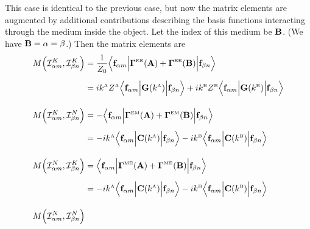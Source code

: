 \documentclass[letterpaper]{article}
\begin{document}
\begin{enumerate}
This case is identical to the previous case, but now the matrix elements
are augmented by additional contributions describing the basis functions
interacting through the medium inside the object. Let the index
of this medium be $\mathbf{B}$. (We have $\mathbf{B}=\alpha=\beta$.) Then
the matrix elements are 
\begin{align*}
 M\Big( \mathcal{I}^K_{\alpha m}, \mathcal{I}^K_{\beta n} \Big) 
 &= \frac{1}{Z_0}
    \Big\langle \vb f_{\alpha m} 
    \Big| \BG\supt{EE}(\vb A) + \BG\supt{EE}(\vb B) \Big|
                \vb f_{\beta n} 
    \Big\rangle
\\[5pt]
 &= ik\supt{A} Z\supt{A}
    \Big\langle \vb f_{\alpha m} 
                 \Big| \vb G(k\supt{A}) \Big|
                 \vb f_{\beta n} 
    \Big\rangle
    +
    ik\supt{B} Z\supt{B}
    \Big\langle \vb f_{\alpha m} 
                 \Big| \vb G(k\supt{B}) \Big|
                 \vb f_{\beta n} 
    \Big\rangle
\\[10pt]
 M\Big( \mathcal{I}^K_{\alpha m}, \mathcal{I}^N_{\beta n} \Big) 
 &= -\Big\langle \vb f_{\alpha m} 
    \Big| \BG\supt{EM}(\vb A) + \BG\supt{EM}(\vb B) \Big|
                \vb f_{\beta n} 
    \Big\rangle
\\[5pt]
 &= -ik\supt{A}
    \Big\langle \vb f_{\alpha m} 
                 \Big| \vb C(k\supt{A}) \Big|
                 \vb f_{\beta n} 
    \Big\rangle
    -ik\supt{B}
    \Big\langle \vb f_{\alpha m} 
                 \Big| \vb C(k\supt{B}) \Big|
                 \vb f_{\beta n} 
    \Big\rangle
\\[10pt]
 M\Big( \mathcal{I}^N_{\alpha m}, \mathcal{I}^K_{\beta n} \Big) 
 &= \Big\langle \vb f_{\alpha m} 
    \Big| \BG\supt{ME}(\vb A) + \BG\supt{ME}(\vb B) \Big|
                \vb f_{\beta n} 
    \Big\rangle
\\[5pt]
 &= -ik\supt{A}
    \Big\langle \vb f_{\alpha m} 
                 \Big| \vb C(k\supt{A}) \Big|
                 \vb f_{\beta n} 
    \Big\rangle
    -ik\supt{B}
    \Big\langle \vb f_{\alpha m} 
                 \Big| \vb C(k\supt{B}) \Big|
                 \vb f_{\beta n} 
    \Big\rangle
\\[10pt]
 M\Big( \mathcal{I}^N_{\alpha m}, \mathcal{I}^N_{\beta n} \Big) 

\end{align*}
\end{enumerate}
\end{document}
